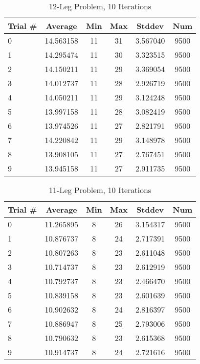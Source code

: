 \documentclass{article}
\begin{document}
\clearpage
\begin{table}
\centering
\begin{tabular}{|l|c|c|c|c|c|}
\hline
Trial \# & Average & Min & Max & Stddev & Num \\
\hline
0 & 14.563158 & 11 & 31 & 3.567040 & 9500 \\ 
1 & 14.295474 & 11 & 30 & 3.323515 & 9500 \\ 
2 & 14.150211 & 11 & 29 & 3.369054 & 9500 \\ 
3 & 14.012737 & 11 & 28 & 2.926719 & 9500 \\ 
4 & 14.050211 & 11 & 29 & 3.124248 & 9500 \\ 
5 & 13.997158 & 11 & 28 & 3.082419 & 9500 \\ 
6 & 13.974526 & 11 & 27 & 2.821791 & 9500 \\ 
7 & 14.220842 & 11 & 29 & 3.148978 & 9500 \\ 
8 & 13.908105 & 11 & 27 & 2.767451 & 9500 \\ 
9 & 13.945158 & 11 & 27 & 2.911735 & 9500 \\ 
\hline
\end{tabular}
\caption{12-Leg Problem, 10 Iterations}
\label{tab:template}
\end{table}

\begin{table}
\centering
\begin{tabular}{|l|c|c|c|c|c|}
\hline
Trial \# & Average & Min & Max & Stddev & Num \\
\hline
0 & 11.265895 & 8 & 26 & 3.154317 & 9500 \\ 
1 & 10.876737 & 8 & 24 & 2.717391 & 9500 \\ 
2 & 10.807263 & 8 & 23 & 2.611048 & 9500 \\ 
3 & 10.714737 & 8 & 23 & 2.612919 & 9500 \\ 
4 & 10.792737 & 8 & 23 & 2.466470 & 9500 \\ 
5 & 10.839158 & 8 & 23 & 2.601639 & 9500 \\ 
6 & 10.902632 & 8 & 24 & 2.816397 & 9500 \\ 
7 & 10.886947 & 8 & 25 & 2.793006 & 9500 \\ 
8 & 10.790632 & 8 & 23 & 2.615368 & 9500 \\ 
9 & 10.914737 & 8 & 24 & 2.721616 & 9500 \\ 
\hline
\end{tabular}
\caption{11-Leg Problem, 10 Iterations}
\label{tab:template}
\end{table}
\end{document}
